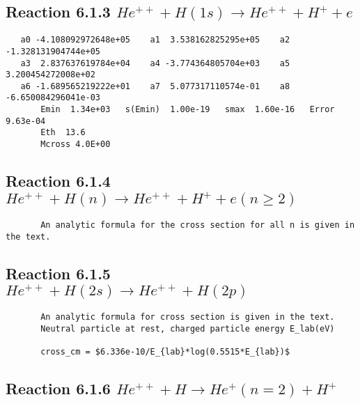 \documentclass[12pt,dvipdfm]{article}
\begin{document}
\newpage
\subsection{
Reaction 6.1.3 $   He^{++} + H(1s) \rightarrow He^{++} + H^+ + e$}


\begin{small}\begin{verbatim}
   a0 -4.108092972648e+05    a1  3.538162825295e+05    a2 -1.328131904744e+05
   a3  2.837637619784e+04    a4 -3.774364805704e+03    a5  3.200454272008e+02
   a6 -1.689565219222e+01    a7  5.077317110574e-01    a8 -6.650084296041e-03
       Emin  1.34e+03   s(Emin)  1.00e-19   smax  1.60e-16   Error 9.63e-04
       Eth  13.6
       Mcross 4.0E+00
\end{verbatim}\end{small}

\newpage
\subsection{
Reaction 6.1.4 $   He^{++} + H(n) \rightarrow  He^{++} + H^+ + e   (n \geq 2)$}

\begin{small}\begin{verbatim}
       An analytic formula for the cross section for all n is given in the text.
\end{verbatim}\end{small}

\newpage
\subsection{
Reaction 6.1.5 $   He^{++} + H(2s) \rightarrow  He^{++} + H(2p)   $}

\begin{small}\begin{verbatim}
       An analytic formula for cross section is given in the text.
       Neutral particle at rest, charged particle energy E_lab(eV)

       cross_cm = $6.336e-10/E_{lab}*log(0.5515*E_{lab})$
\end{verbatim}\end{small}

\newpage
\subsection{
Reaction 6.1.6 $   He^{++} + H \rightarrow He^+(n=2) + H^+$}
\end{document}
